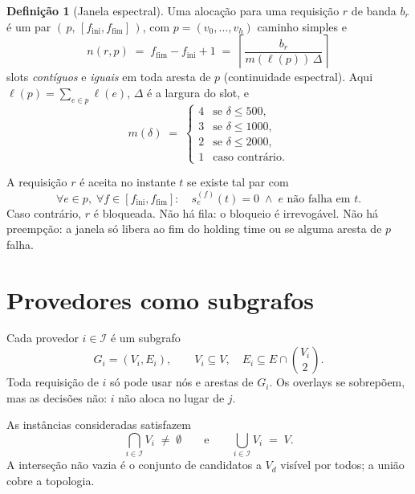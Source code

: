 \documentclass[11pt,a4paper]{article}
\theoremstyle{definition}
\newtheorem{definicao}{Definição}
\begin{document}
\begin{definicao}[Janela espectral]
Uma alocação para uma requisição $r$ de banda $b_r$ é um par $(\,p,\,[f_{\mathrm{ini}},f_{\mathrm{fim}}]\,)$,
com $p=(v_0,\dots,v_h)$ caminho simples e
\begin{equation}
  n(r,p)
  \;=\;
  f_{\mathrm{fim}}-f_{\mathrm{ini}}+1
  \;=\;
  \left\lceil
    \frac{b_r}{m(\ell(p))\,\Delta}
  \right\rceil
\end{equation}
slots \emph{contíguos} e \emph{iguais} em toda aresta de $p$ (continuidade espectral).
Aqui $\ell(p)=\sum_{e\in p}\ell(e)$, $\Delta$ é a largura do slot, e
\begin{equation}
  m(\delta)
  \;=\;
  \begin{cases}
    4 & \text{se }\delta\le 500,\\
    3 & \text{se }\delta\le 1000,\\
    2 & \text{se }\delta\le 2000,\\
    1 & \text{caso contrário.}
  \end{cases}
\end{equation}
\end{definicao}

A requisição $r$ é aceita no instante $t$ se existe tal par com
\begin{equation}
  \forall e\in p,\;
  \forall f\in[f_{\mathrm{ini}},f_{\mathrm{fim}}]:
  \quad
  s_e^{(f)}(t)=0
  \;\wedge\;
  e\text{ não falha em $t$}.
\end{equation}
Caso contrário, $r$ é bloqueada.
Não há fila: o bloqueio é irrevogável.
Não há preempção: a janela só libera ao fim do holding time ou se alguma aresta de $p$ falha.

\section{Provedores como subgrafos}

Cada provedor $i\in\mathcal{I}$ é um subgrafo
\begin{equation}
  G_i=(V_i,E_i),
  \qquad
  V_i\subseteq V,\quad
  E_i\subseteq E\cap\binom{V_i}{2}.
\end{equation}
Toda requisição de $i$ só pode usar nós e arestas de $G_i$.
Os overlays se sobrepõem, mas as decisões não: $i$ não aloca no lugar de $j$.

As instâncias consideradas satisfazem
\begin{equation}
  \bigcap_{i\in\mathcal{I}} V_i \;\neq\; \emptyset
  \qquad\text{e}\qquad
  \bigcup_{i\in\mathcal{I}} V_i \;=\; V.
\end{equation}
A interseção não vazia é o conjunto de candidatos a $V_d$ visível por todos; a união cobre a topologia.
\end{document}
